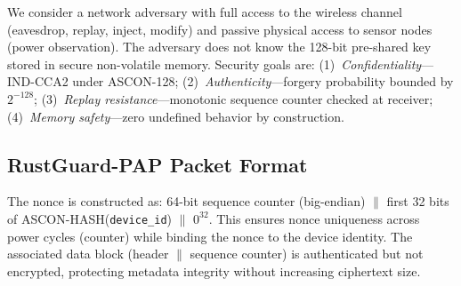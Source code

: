 \documentclass[conference]{IEEEtran}
\begin{document}
We consider a network adversary with full access to the wireless channel
(eavesdrop, replay, inject, modify) and passive physical access to sensor
nodes (power observation). The adversary does not know the 128-bit pre-shared
key stored in secure non-volatile memory. Security goals are:
(1)~\emph{Confidentiality}---IND-CCA2 under ASCON-128;
(2)~\emph{Authenticity}---forgery probability bounded by $2^{-128}$;
(3)~\emph{Replay resistance}---monotonic sequence counter checked at receiver;
(4)~\emph{Memory safety}---zero undefined behavior by construction.

\subsection{RustGuard-PAP Packet Format}
\label{sec:pap}

\begin{table}[!ht]
\centering
\caption{RustGuard-PAP Packet Wire Format}
\label{tab:packet}
\renewcommand{\arraystretch}{1.2}
\footnotesize
{}
\end{table}

The nonce is constructed as: 64-bit sequence counter (big-endian) $\|$
first 32 bits of ASCON-HASH(\texttt{device\_id}) $\|$ $0^{32}$. This ensures
nonce uniqueness across power cycles (counter) while binding the nonce to the
device identity. The associated data block (header $\|$ sequence counter) is
authenticated but not encrypted, protecting metadata integrity without
increasing ciphertext size.
\end{document}
